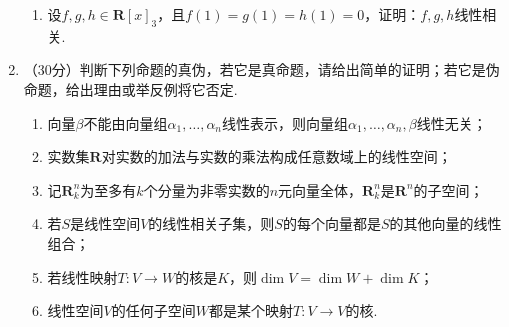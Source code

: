 \begin{enumerate}
\begin{enumerate}
        \item 设$f,g,h\in\mathbf{R}[x]_3$，且$f(1)=g(1)=h(1)=0$，证明：$f,g,h$线性相关.
    \end{enumerate}

    \item （30分）判断下列命题的真伪，若它是真命题，请给出简单的证明；若它是伪命题，给出理由或举反例将它否定.
    \begin{enumerate}
        \item 向量$\beta$不能由向量组$\alpha_1,\ldots,\alpha_n$线性表示，则向量组$\alpha_1,\ldots,\alpha_n,\beta$线性无关；

        \item 实数集$\mathbf{R}$对实数的加法与实数的乘法构成任意数域上的线性空间；

        \item 记$\mathbf{R}_k^n$为至多有$k$个分量为非零实数的$n$元向量全体，$\mathbf{R}_k^n$是$\mathbf{R}^n$的子空间；

        \item 若$S$是线性空间$V$的线性相关子集，则$S$的每个向量都是$S$的其他向量的线性组合；

        \item 若线性映射$T\colon V\to W$的核是$K$，则$\dim V=\dim W+\dim K$；

        \item 线性空间$V$的任何子空间$W$都是某个映射$T\colon V\to V$的核.
    \end{enumerate}
\end{enumerate}

\clearpage
